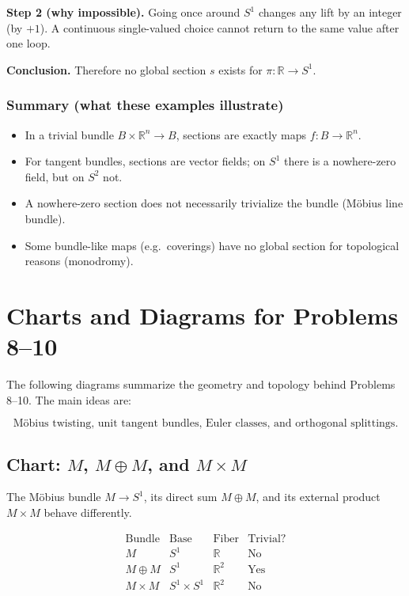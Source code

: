 \documentclass[12pt,a4paper]{article}
\newcommand{\R}{\mathbb{R}}
\theoremstyle{notespace}
\begin{document}
	\textbf{Step 2 (why impossible).} Going once around $S^1$ changes any lift by an integer (by $+1$).
	A continuous single-valued choice cannot return to the same value after one loop.
	
	\textbf{Conclusion.} Therefore no global section $s$ exists for $\pi:\mathbb{R}\to S^1$.
	
	\subsubsection*{Summary (what these examples illustrate)}
	\begin{itemize}
		\item In a trivial bundle $B\times \mathbb{R}^n\to B$, sections are exactly maps $f:B\to \mathbb{R}^n$.
		\item For tangent bundles, sections are vector fields; on $S^1$ there is a nowhere-zero field, but on $S^2$ not.
		\item A nowhere-zero section does not necessarily trivialize the bundle (M\"obius line bundle).
		\item Some bundle-like maps (e.g.\ coverings) have no global section for topological reasons (monodromy).
	\end{itemize}
	



	
	\section{Charts and Diagrams for Problems 8--10}
	
	The following diagrams summarize the geometry and topology behind Problems 8--10. The main ideas are:
	
	\[
	\boxed{
		\text{M\"obius twisting, unit tangent bundles, Euler classes, and orthogonal splittings.}
	}
	\]
	
	\subsection{Chart: \(M\), \(M\oplus M\), and \(M\times M\)}
	
	The M\"obius bundle \(M\to S^{1}\), its direct sum \(M\oplus M\), and its external product \(M\times M\) behave differently.
	
	\[
	\begin{array}{c|c|c|c}
		\text{Bundle} & \text{Base} & \text{Fiber} & \text{Trivial?}\\
		\hline
		M & S^{1} & \R & \text{No}\\[2pt]
		M\oplus M & S^{1} & \R^{2} & \text{Yes}\\[2pt]
		M\times M & S^{1}\times S^{1} & \R^{2} & \text{No}
	\end{array}
	\]
	
\end{document}
